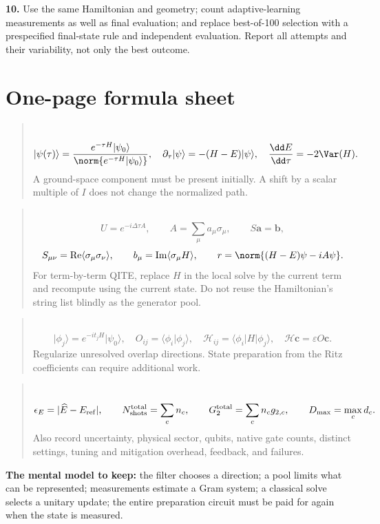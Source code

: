 \documentclass[11pt,a4paper]{article}
\newcommand{\ket}[1]{\lvert #1\rangle}
\newcommand{\bra}[1]{\langle #1\rvert}
\newcommand{\braket}[2]{\langle #1\vert #2\rangle}
\newcommand{\ex}[1]{\langle #1\rangle}
\newcommand{\Rea}{\operatorname{Re}}
\newcommand{\Ima}{\operatorname{Im}}
\newcommand{\dt}{\Delta\tau}
\newcommand{\lesson}[2]{\clearpage\section{#1}\label{#2}}
\newenvironment{idea}[1][Main idea]{\par\smallskip\begin{quotation}\noindent{\bfseries\textcolor{keyblue}{#1.}}\ }{\end{quotation}\smallskip}
\begin{document}
\textbf{10.} Use the same Hamiltonian and geometry; count adaptive-learning measurements as well as final evaluation; and replace best-of-100 selection with a prespecified final-state rule and independent evaluation. Report all attempts and their variability, not only the best outcome.

\lesson{One-page formula sheet}{sec:cheatsheet}
\begin{idea}[Exact imaginary time]
\[
\ket{\psi(\tau)}=\frac{e^{-\tau H}\ket{\psi_0}}{\norm{e^{-\tau H}\ket{\psi_0}}},\quad
\partial_\tau\ket{\psi}=-(H-E)\ket{\psi},\quad
\frac{\dd E}{\dd\tau}=-2\Var(H).
\]
A ground-space component must be present initially. A shift by a scalar multiple of $I$ does not change the normalized path.
\end{idea}

\begin{idea}[QITE update: our sign convention]
\[
U=e^{-i\dt A},\qquad A=\sum_\mu a_\mu\sigma_\mu,\qquad
S\bm a=\bm b,
\]
\[
S_{\mu\nu}=\Rea\ex{\sigma_\mu\sigma_\nu},\qquad
b_\mu=\Ima\ex{\sigma_\mu H},\qquad
r=\norm{(H-E)\psi-iA\psi}.
\]
For term-by-term QITE, replace $H$ in the local solve by the current term and recompute using the current state. Do not reuse the Hamiltonian's string list blindly as the generator pool.
\end{idea}

\begin{idea}[Krylov energy extraction]
\[
\ket{\phi_j}=e^{-it_jH}\ket{\psi_0},\quad
O_{ij}=\braket{\phi_i}{\phi_j},\quad
\mathcal H_{ij}=\bra{\phi_i}H\ket{\phi_j},\quad
\mathcal H\bm c=\varepsilon O\bm c.
\]
Regularize unresolved overlap directions. State preparation from the Ritz coefficients can require additional work.
\end{idea}

\begin{idea}[The resource ledger]
\[
\epsilon_E=|\widehat E-E_{\rm ref}|,\qquad
N_{\rm shots}^{\rm total}=\sum_c n_c,\qquad
G_2^{\rm total}=\sum_c n_cg_{2,c},\qquad D_{\max}=\max_c d_c.
\]
Also record uncertainty, physical sector, qubits, native gate counts, distinct settings, tuning and mitigation overhead, feedback, and failures.
\end{idea}

\textbf{The mental model to keep:} the filter chooses a direction; a pool limits what can be represented; measurements estimate a Gram system; a classical solve selects a unitary update; the entire preparation circuit must be paid for again when the state is measured.
\end{document}
